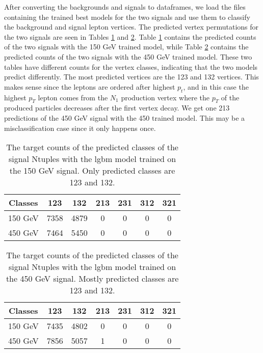 \documentclass[a4paper, american, 12pt]{report}
\begin{document}
	After converting the backgrounds and signals to dataframes, we load the files containing the trained best models for the two signals and use them to classify the background and signal lepton vertices. The predicted vertex permutations for the two signals are seen in Tables \ref{tab:Counts_150signal_Ntuples} and \ref{tab:Counts_450signal_Ntuples}. Table \ref{tab:Counts_150signal_Ntuples} contains the predicted counts of the two signals with the 150 GeV trained model, while Table \ref{tab:Counts_450signal_Ntuples} contains the predicted counts of the two signals with the 450 GeV trained model. These two tables have different counts for the vertex classes, indicating that the two models predict differently. The most predicted vertices are the 123 and 132 vertices. This makes sense since the leptons are ordered after highest $p_t$, and in this case the highest $p_T$ lepton comes from the $N_1$ production vertex where the $p_T$ of the produced particles decreases after the first vertex decay. We get one 213 predictions of the 450 GeV signal with the 450 trained model. This may be a misclassification case since it only happens once.
	\begin{table}[htbp!]
		\centering
		\begin{tabular}{ |c|c|c|c|c|c|c| }
			\hline \rule{0pt}{13pt}
			Classes & 123 & 132 & 213 & 231 & 312 & 321 \\
			\hline \rule{0pt}{13pt}
			150 GeV & 7358 & 4879 & 0 & 0 & 0 & 0 \\
			\hline \rule{0pt}{13pt}
			450 GeV & 7464 & 5450 & 0 & 0 & 0 & 0 \\
			\hline
		\end{tabular}	
		\caption[Target counts of predicted signal Ntuples with the 150 GeV trained model.]{The target counts of the predicted classes of the signal Ntuples with the \acrshort{lgbm} model trained on the 150 GeV signal. Only predicted classes are 123 and 132.}
		\label{tab:Counts_150signal_Ntuples}
	\end{table}
	\begin{table}[htbp!]
		\centering
		\begin{tabular}{ |c|c|c|c|c|c|c| }
			\hline \rule{0pt}{13pt}
			Classes & 123 & 132 & 213 & 231 & 312 & 321 \\
			\hline \rule{0pt}{13pt}
			150 GeV & 7435 & 4802 & 0 & 0 & 0 & 0 \\
			\hline \rule{0pt}{13pt}
			450 GeV & 7856 & 5057 & 1 & 0 & 0 & 0 \\
			\hline
		\end{tabular}	
		\caption[Target counts of predicted signal Ntuples with the 450 GeV trained model.]{The target counts of the predicted classes of the signal Ntuples with the \acrshort{lgbm} model trained on the 450 GeV signal. Mostly predicted classes are 123 and 132.}
		\label{tab:Counts_450signal_Ntuples}
	\end{table}
\end{document}
